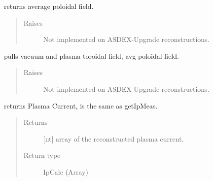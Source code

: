 \documentclass[letterpaper,10pt,english]{sphinxmanual}
\begin{document}
\begin{fulllineitems}
\begin{fulllineitems}
\label{\detokenize{eqtools:eqtools.AUGData.AUGDDData.getBpAvg}}
returns average poloidal field.
\begin{quote}\begin{description}
\item[{Raises}] \leavevmode
{} \textendash{} Not implemented on ASDEX-Upgrade reconstructions.

\end{description}\end{quote}

\end{fulllineitems}


\begin{fulllineitems}
\label{\detokenize{eqtools:eqtools.AUGData.AUGDDData.getFields}}
pulls vacuum and plasma toroidal field, avg poloidal field.
\begin{quote}\begin{description}
\item[{Raises}] \leavevmode
{} \textendash{} Not implemented on ASDEX-Upgrade reconstructions.

\end{description}\end{quote}

\end{fulllineitems}


\begin{fulllineitems}
\label{\detokenize{eqtools:eqtools.AUGData.AUGDDData.getIpCalc}}
returns Plasma Current, is the same as getIpMeas.
\begin{quote}\begin{description}
\item[{Returns}] \leavevmode
{[}nt{]} array of the reconstructed plasma current.

\item[{Return type}] \leavevmode
IpCalc (Array)


\end{description}
\end{quote}
\end{fulllineitems}
\end{fulllineitems}
\end{document}
